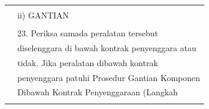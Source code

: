 \documentclass[
]{article}
\begin{document}
\begin{longtable}[]{@{}ll@{}}
\begin{minipage}[t]{0.71\columnwidth}
\strut
\end{minipage}\tabularnewline
\begin{minipage}[t]{0.23\columnwidth}\raggedright
\strut
\end{minipage} & \begin{minipage}[t]{0.71\columnwidth}\raggedright
ii) GANTIAN\strut
\end{minipage}\tabularnewline
\begin{minipage}[t]{0.23\columnwidth}\raggedright
\strut
\end{minipage} & \begin{minipage}[t]{0.71\columnwidth}\raggedright
\strut
\end{minipage}\tabularnewline
\begin{minipage}[t]{0.23\columnwidth}\raggedright
\strut
\end{minipage} & \begin{minipage}[t]{0.71\columnwidth}\raggedright
23. Periksa samada peralatan tersebut\strut
\end{minipage}\tabularnewline
\begin{minipage}[t]{0.23\columnwidth}\raggedright
\strut
\end{minipage} & \begin{minipage}[t]{0.71\columnwidth}\raggedright
diselenggara di bawah kontrak penyenggara atau\strut
\end{minipage}\tabularnewline
\begin{minipage}[t]{0.23\columnwidth}\raggedright
\strut
\end{minipage} & \begin{minipage}[t]{0.71\columnwidth}\raggedright
tidak. Jika peralatan dibawah kontrak\strut
\end{minipage}\tabularnewline
\begin{minipage}[t]{0.23\columnwidth}\raggedright
\strut
\end{minipage} & \begin{minipage}[t]{0.71\columnwidth}\raggedright
penyenggara patuhi Prosedur Gantian Komponen\strut
\end{minipage}\tabularnewline
\begin{minipage}[t]{0.23\columnwidth}\raggedright
\strut
\end{minipage} & \begin{minipage}[t]{0.71\columnwidth}\raggedright
Dibawah Kontrak Penyenggaraan (Langkah\strut
\end{minipage}\tabularnewline
\begin{minipage}[t]{0.23\columnwidth}\raggedright

\end{minipage}
\end{longtable}
\end{document}
